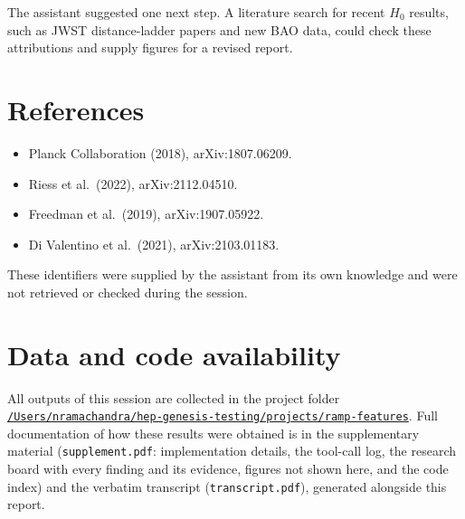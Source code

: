 \documentclass[11pt,a4paper]{article}
\begin{document}
The assistant suggested one next step. A literature search for recent $H_0$ results, such as JWST distance-ladder papers and new BAO data, could check these attributions and supply figures for a revised report.

\section*{References}
\begin{itemize}
\item Planck Collaboration (2018), arXiv:1807.06209.
\item Riess et al.\ (2022), arXiv:2112.04510.
\item Freedman et al.\ (2019), arXiv:1907.05922.
\item Di Valentino et al.\ (2021), arXiv:2103.01183.
\end{itemize}
These identifiers were supplied by the assistant from its own knowledge and were not retrieved or checked during the session.

\section*{Data and code availability}
All outputs of this session are collected in the project folder \href{file:///Users/nramachandra/hep-genesis-testing/projects/ramp-features}{\texttt{/\allowbreak{}Users/\allowbreak{}nramachandra/\allowbreak{}hep-genesis-testing/\allowbreak{}projects/\allowbreak{}ramp-features}}.
Full documentation of how these results were obtained is in the supplementary material (\texttt{supplement.pdf}: implementation details, the tool-call log, the research board with every finding and its evidence, figures not shown here, and the code index) and the verbatim transcript (\texttt{transcript.pdf}), generated alongside this report.
\end{document}
